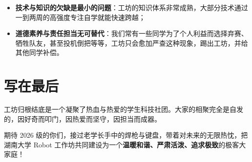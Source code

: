 \documentclass[a4paper,11pt,oneside]{scrreprt}
\begin{document}
\begin{itemize}
    \item \textbf{技术与知识的欠缺是最小的问题}：工坊的知识体系非常成熟，大部分技术通过一到两周的高强度专注自学就能快速跨越；
    \item \textbf{道德素养与责任担当无可替代}：我们常有一些同学为了个人利益而选择弃赛、牺牲队友，甚至投机倒把等等，工坊只会愈加严查这种现象，踢出工坊，并给其他同学补偿。
\end{itemize}

\section*{写在最后}
{}

工坊归根结底是一个凝聚了热血与热爱的学生科技社团。大家的相聚完全是自发的，因好奇而叩门，因热爱而坚守，因担当而成器。

期待 2026 级的你们，接过老学长手中的焊枪与键盘，带着对未来的无限热忱，把湖南大学 Robot 工作坊共同建设为一个\textbf{温暖和谐、严肃活泼、追求极致}的极客大家庭！
\end{document}
